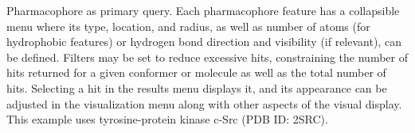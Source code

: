 \label{pharmfig} 
Pharmacophore as primary query. Each pharmacophore feature has a collapsible menu where its type, location, and radius, as well as number of atoms (for hydrophobic features) or hydrogen bond direction and visibility (if relevant), can be defined. Filters may be set to reduce excessive hits, constraining the number of hits returned for a given conformer or molecule as well as the total number of hits. Selecting a hit in the results menu displays it, and its appearance can be adjusted in the visualization menu along with other aspects of the visual display. This example uses tyrosine-protein kinase c-Src (PDB ID: 2SRC).
